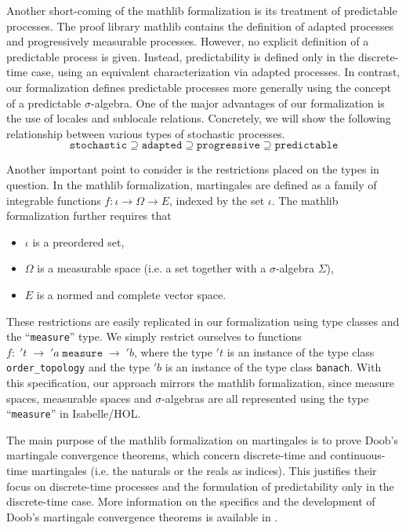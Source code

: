 Another short-coming of the \textsf{mathlib} formalization is its treatment of predictable processes. The proof library \textsf{mathlib} contains the definition of adapted processes and progressively measurable processes. However, no explicit definition of a predictable process is given. Instead, predictability is defined only in the discrete-time case, using an equivalent characterization via adapted processes. In contrast, our formalization defines predictable processes more generally using the concept of a predictable $\sigma$-algebra. One of the major advantages of our formalization is the use of locales and sublocale relations. Concretely, we will show the following relationship between various types of stochastic processes.
\[
	\texttt{stochastic} \supseteq \texttt{adapted} \supseteq \texttt{progressive} \supseteq \texttt{predictable}
\]

Another important point to consider is the restrictions placed on the types in question. In the \textsf{mathlib} formalization, martingales are defined as a family of integrable functions $f : \iota \rightarrow \Omega \rightarrow E$, indexed by the set $\iota$. The \textsf{mathlib} formalization further requires that
\begin{itemize}
\item $\iota$ is a preordered set,
\item $\Omega$ is a measurable space (i.e. a set together with a $\sigma$-algebra $\Sigma$),
\item $E$ is a normed and complete vector space.
\end{itemize}

These restrictions are easily replicated in our formalization using type classes and the ``\texttt{measure}'' type. We simply restrict ourselves to functions $f : \; 't \;\rightarrow \; 'a \;\texttt{measure} \;\rightarrow\; 'b$, where the type $'t$ is an instance of the type class \texttt{order\_topology} and the type $'b$ is an instance of the type class \texttt{banach}. With this specification, our approach mirrors the \textsf{mathlib} formalization, since measure spaces, measurable spaces and $\sigma$-algebras are all represented using the type ``\texttt{measure}'' in Isabelle/HOL.

The main purpose of the \textsf{mathlib} formalization on martingales is to prove Doob's martingale convergence theorems, which concern discrete-time and continuous-time martingales (i.e. the naturals or the reals as indices). This justifies their focus on discrete-time processes and the formulation of predictability only in the discrete-time case. More information on the specifics and the development of Doob's martingale convergence theorems is available in \cite{ying2022formalization}.

